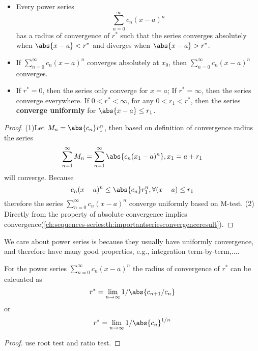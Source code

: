 \begin{refsection}
\begin{theorem}
	\cite[423]{kaplan1973advanced} \hfill
	\begin{itemize}
		\item Every power series $$\sum_{n=0}^\infty c_n(x-a)^n$$ has a radius of convergence of $r^*$ such that the series converges absolutely when $\abs{x-a} < r^*$ and diverges when $\abs{x-a} > r^*$.
		\item If $\sum_{n=0}^\infty c_n(x-a)^n$ converges absolutely at $x_0$, then $\sum_{n=0}^\infty c_n(x-a)^n$ converges.
		\item If $r^* = 0$, then the series only converge for $x=a$; If $r^* = \infty$, then the series converge everywhere. If $0<r^*<\infty$, for any $0<r_1<r^*$, then the series \textbf{converge uniformly} for $\abs{x-a}\leq r_1$. 
	\end{itemize} 
\end{theorem}
\begin{proof}
	(1)Let $M_n = \abs{c_n}r_1^n$, then based on definition of convergence radius
	the series
	$$\sum_{n=1}^\infty M_n = \sum_{n=1}^\infty \abs{c_n(x_1-a)^n},x_1 = a+r_1$$
	will converge. 
	Because $$c_n(x-a)^n \leq \abs{c_n}r_1^n,\forall (x-a)\leq r_1$$
	therefore the series $\sum_{n=0}^\infty c_n(x-a)^n$ converge uniformly based on M-test.
	(2) Directly from the property of absolute convergence implies convergence(\autoref{ch:sequences-series:th:importantseriesconvergenceresult}).
\end{proof}

\begin{remark} We care about power series is because they usually have uniformly convergence, and therefore have many good properties, e.g., integration term-by-term,.... 
\end{remark}


\begin{lemma}\label{ch:function-sequences-series--approximation:th:calculatingConvergenceradiusForPowerSeries}
	\cite[423]{kaplan1973advanced} For the  power series $\sum_{n=0}^\infty c_n(x-a)^n$ the radius of convergence of $r^*$ can be calcuated as
	$$r^* = \lim_{n\to\infty} 1/ \abs{c_{n+1}/c_n}$$ 
	or
	$$r^* = \lim_{n\to\infty} 1/ \abs{c_{n}}^{1/n}$$
\end{lemma}
\begin{proof}
	use root test and ratio test. 
\end{proof}


\end{refsection}
